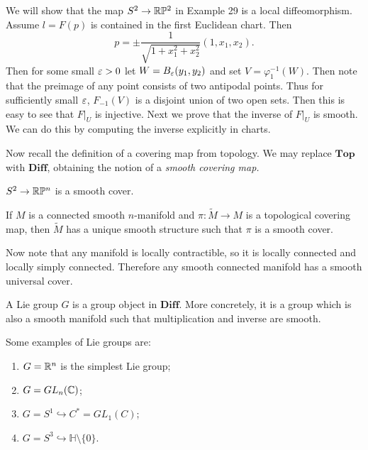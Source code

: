 \documentclass[twoside, 10pt]{article}
\begin{document}
    
    We will show that the map $S^2 \to \mathbb{R}\mathbb{P}^2$ in Example 29 is a local
    diffeomorphism. Assume $l = F(p)$ is contained in the first Euclidean
    chart. Then \[p = \pm \frac{1}{\sqrt{1+x_1^2+x_2^2}}(1,x_1,x_2).\] Then for
    some small $\varepsilon > 0$ let $W = B_{\varepsilon}(y_1,y_2)$ and set $V =
    \varphi_1^{-1}(W)$. Then note that the preimage of any point consists of
    two antipodal points. Thus for sufficiently small $\varepsilon$, $F_{-1}(V)$ is a
    disjoint union of two open sets. Then this is easy to see that $F|_U$ is
    injective. Next we prove that the inverse of $F|_U$ is smooth. We can do
    this by computing the inverse explicitly in charts.

    Now recall the definition of a covering map from topology. We may replace
    $\mathbf{Top}$ with $\mathbf{Diff}$, obtaining the notion of a
    \textit{smooth covering map.}

    \begin{exm} $S^2 \to \mathbb{R}\mathbb{P}^n$ is a smooth cover.  \end{exm}

    \begin{prop} If $M$ is a connected smooth $n$-manifold and $\pi:
    \widetilde{M} \to M$ is a topological covering map, then $\widetilde{M}$
has a unique smooth structure such that $\pi$ is a smooth cover.  \end{prop}

    Now note that any manifold is locally contractible, so it is locally
    connected and locally simply connected. Therefore any smooth connected
    manifold has a smooth universal cover.

    \begin{defn} A Lie group $G$ is a group object in $\mathbf{Diff}$. More
    concretely, it is a group which is also a smooth manifold such that
multiplication and inverse are smooth.  \end{defn}

    \begin{exm} Some examples of Lie groups are: \begin{enumerate} \item $G =
        \mathbb{R}^n$ is the simplest Lie group; \item $G = GL_n(\mathbb{C})$; \item $G = S^1
        \hookrightarrow C^* = GL_1(C)$; \item $G = S^3 \hookrightarrow
        \mathbb{H} \setminus \{0\}$.  \end{enumerate} \end{exm}
\end{document}
